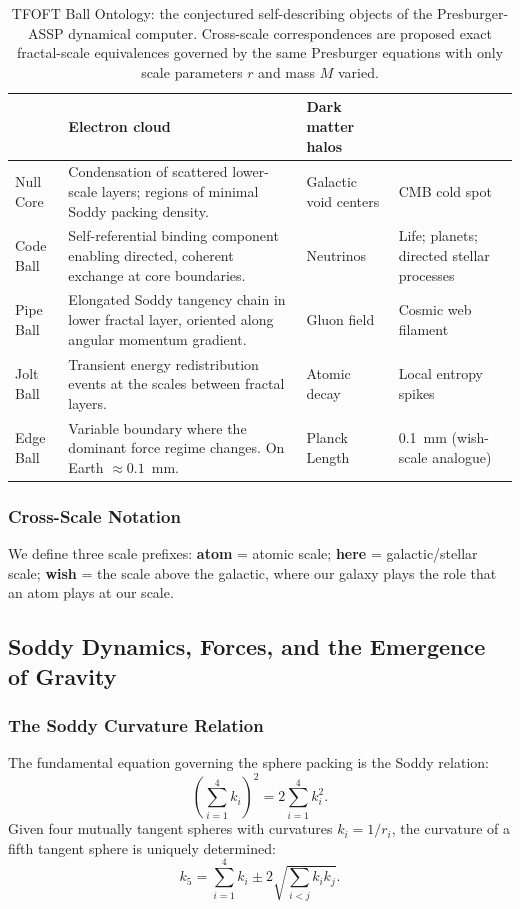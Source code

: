\documentclass[11pt,a4paper]{article}
\begin{document}
\begin{table}[h]
\begin{tabular}{|l|p{4.5cm}|p{2cm}|p{2.5cm}|}
  & Electron cloud 
  & Dark matter halos \\
\hline
Null Core  
  & Condensation of scattered lower-scale layers; regions of minimal Soddy packing density.
  & Galactic void centers 
  & CMB cold spot \\
\hline
Code Ball  
  & Self-referential binding component enabling directed, coherent exchange at core boundaries.
  & Neutrinos 
  & Life; planets; directed stellar processes \\
\hline
Pipe Ball  
  & Elongated Soddy tangency chain in lower fractal layer, oriented along angular momentum gradient.
  & Gluon field 
  & Cosmic web filament \\
\hline
Jolt Ball  
  & Transient energy redistribution events at the scales between fractal layers.
  & Atomic decay 
  & Local entropy spikes \\
\hline
Edge Ball  
  & Variable boundary where the dominant force regime changes. On Earth $\approx 0.1$~mm.
  & Planck Length 
  & 0.1~mm (wish-scale analogue) \\
\hline
\end{tabular}
\caption{TFOFT Ball Ontology: the conjectured self-describing objects of the Presburger-ASSP dynamical computer. Cross-scale correspondences are proposed exact fractal-scale equivalences governed by the same Presburger equations with only scale parameters $r$ and mass $M$ varied.}
\end{table}

\subsubsection{Cross-Scale Notation}

We define three scale prefixes: \textbf{atom} = atomic scale; \textbf{here} = galactic/stellar scale; \textbf{wish} = the scale above the galactic, where our galaxy plays the role that an atom plays at our scale.

\subsection{Soddy Dynamics, Forces, and the Emergence of Gravity}

\subsubsection{The Soddy Curvature Relation}

The fundamental equation governing the sphere packing is the Soddy relation:
\[
\left(\sum_{i=1}^4 k_i\right)^2 = 2\sum_{i=1}^4 k_i^2.
\]
Given four mutually tangent spheres with curvatures $k_i = 1/r_i$, the curvature of a fifth tangent sphere is uniquely determined:
\[
k_5 = \sum_{i=1}^4 k_i \pm 2\sqrt{\sum_{i<j} k_i k_j}.
\]
\end{document}
